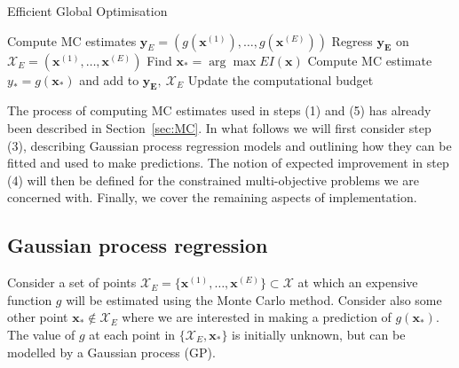 \documentclass[sagev, Crown]{sagej}
\begin{document}
\begin{algorithm}
\caption{Efficient Global Optimisation~\cite{Jones1998}}\label{alg:EGO}
\begin{algorithmic}[1]
\State Compute MC estimates $\mathbf{y}_{E} = (g(\mathbf{x}^{(1)}), \ldots , g(\mathbf{x}^{(E)}))$
\State Regress $\mathbf{y_{E}}$ on $\mathcal{X}_{E} = (\mathbf{x}^{(1)}, \ldots , \mathbf{x}^{(E)})$
\State Find $\mathbf{x}_{*} = \arg\max EI(\mathbf{x})$
\State Compute MC estimate $y_{*} = g(\mathbf{x}_{*})$ and add to $\mathbf{y_{E}},~\mathcal{X}_{E}$
\State Update the computational budget
\EndWhile
\end{algorithmic}
\end{algorithm}

The process of computing MC estimates used in steps (1) and (5) has already been described in Section~\ref{sec:MC}. In what follows we will first consider step (3), describing Gaussian process regression models and outlining how they can be fitted and used to make predictions. The notion of expected improvement in step (4) will then be defined for the constrained multi-objective problems we are concerned with. Finally, we cover the remaining aspects of implementation.


\subsection{Gaussian process regression}\label{sec:GP}

Consider a set of points $\mathcal{X}_{E} = \{ \textbf{x}^{(1)}, \ldots , \textbf{x}^{(E)} \} \subset \mathcal{X}$ at which an expensive function $g$ will be estimated using the Monte Carlo method. Consider also some other point $\mathbf{x}_{*} \not\in \mathcal{X}_{E}$ where we are interested in making a prediction of $g(\mathbf{x}_{*})$. The value of $g$ at each point in $\{\mathcal{X}_{E}, \mathbf{x}_{*}\}$ is initially unknown, but can be modelled by a Gaussian process (GP). 
\end{document}
